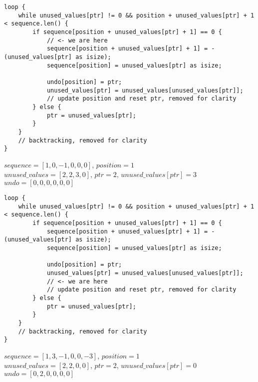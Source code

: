 \begin{frame}[fragile]
    \begin{verbatim}
loop {
    while unused_values[ptr] != 0 && position + unused_values[ptr] + 1 < sequence.len() {
        if sequence[position + unused_values[ptr] + 1] == 0 {
            // <- we are here
            sequence[position + unused_values[ptr] + 1] = -(unused_values[ptr] as isize);
            sequence[position] = unused_values[ptr] as isize;

            undo[position] = ptr;
            unused_values[ptr] = unused_values[unused_values[ptr]];
            // update position and reset ptr, removed for clarity
        } else {
            ptr = unused_values[ptr];
        }
    }
    // backtracking, removed for clarity
}
    \end{verbatim}
    $sequence = [1, 0, -1, 0, 0, 0]$, $position = 1$\\
    $unused\_values = [2, 2, 3, 0]$, $ptr = 2$, $unused\_values[ptr] = 3$\\
    $undo = [0, 0, 0, 0, 0, 0]$
\end{frame}
\begin{frame}[fragile]
    \begin{verbatim}
loop {
    while unused_values[ptr] != 0 && position + unused_values[ptr] + 1 < sequence.len() {
        if sequence[position + unused_values[ptr] + 1] == 0 {
            sequence[position + unused_values[ptr] + 1] = -(unused_values[ptr] as isize);
            sequence[position] = unused_values[ptr] as isize;
            
            undo[position] = ptr;
            unused_values[ptr] = unused_values[unused_values[ptr]];
            // <- we are here
            // update position and reset ptr, removed for clarity
        } else {
            ptr = unused_values[ptr];
        }
    }
    // backtracking, removed for clarity
}
    \end{verbatim}
    $sequence = [1, 3, -1, 0, 0, -3]$, $position = 1$\\
    $unused\_values = [2, 2, 0, 0]$, $ptr = 2$, $unused\_values[ptr] = 0$\\
    $undo = [0, 2, 0, 0, 0, 0]$
\end{frame}
